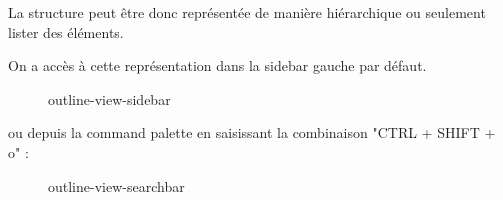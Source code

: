 \documentclass[
    iict, %
    il, %
]{heig-tb}
\begin{document}
La structure peut être donc représentée de manière hiérarchique ou seulement lister des éléments.

On a accès à cette représentation dans la sidebar gauche par défaut.

\begin{figure}[!h]
    \begin{center}
    \end{center}
    \caption[Outline view disponible depuis la sidebar]{\label{outline-view-sidebar} outline-view-sidebar}
\end{figure}

ou depuis la command palette en saisissant la combinaison "CTRL + SHIFT + o" :

\begin{figure}[!h]
    \begin{center}
    \end{center}
    \caption[Outline view disponible depuis la searchbar]{\label{outline-view-searchbar} outline-view-searchbar}
\end{figure}
\end{document}
